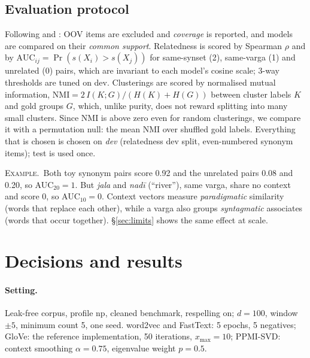 \documentclass[11pt]{article}
\newcommand{\vk}[1]{\textsf{#1}}
\newcommand{\ex}{\par\smallskip\noindent\textsc{Example.}~}
\begin{document}
\subsection{Evaluation protocol}\label{sec:protocol}
Following \citet{schnabel2015evaluation} and \citet{faruqui2016problems}:
OOV items are excluded and \emph{coverage} is reported, and models are
compared on their \emph{common support}. Relatedness is scored by Spearman
$\rho$ and by $\mathrm{AUC}_{ij}=\Pr(s(X_i)>s(X_j))$ for same-synset (2),
same-varga (1) and unrelated (0) pairs, which are invariant to each model's
cosine scale; 3-way thresholds are tuned on dev.
Clusterings are scored by normalised mutual information,
$\mathrm{NMI}=2\,I(K;G)/(H(K)+H(G))$ between cluster labels $K$ and gold
groups $G$, which, unlike purity, does not reward splitting into many
small clusters. Since NMI is above zero even for random clusterings, we
compare it with a permutation null: the mean NMI over shuffled gold labels.
Everything that is chosen is chosen on
\emph{dev} (relatedness dev split, even-numbered synonym items); test is
used once.

\ex Both toy synonym pairs score 0.92 and the unrelated pairs 0.08 and 0.20,
so AUC$_{20}=1$. But \emph{jala} and \emph{nadī} (``river''), same varga,
share no context and score 0, so AUC$_{10}=0$. Context vectors measure
\emph{paradigmatic} similarity (words that replace each other), while a
varga also groups \emph{syntagmatic} associates (words that occur
together). \S\ref{sec:limits} shows the same effect at scale.

\section{Decisions and results}\label{sec:results}
\paragraph{Setting.} Leak-free corpus, profile \vk{np}, cleaned benchmark,
respelling on; $d=100$, window $\pm5$, minimum count 5, one seed. word2vec
and FastText: 5 epochs, 5 negatives; GloVe: the reference implementation,
50 iterations, $x_{\max}=10$; PPMI-SVD: context smoothing $\alpha=0.75$,
eigenvalue weight $p=0.5$.
\end{document}
